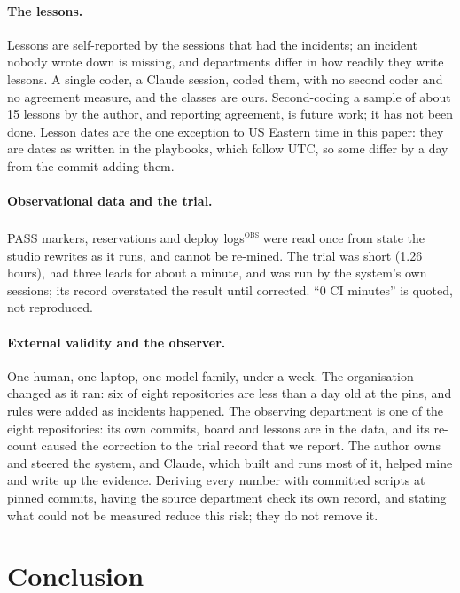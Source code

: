 \documentclass[11pt]{article}
\newcommand{\obs}{\textsuperscript{\textsc{obs}}}
\begin{document}
\paragraph{The lessons.}
Lessons are self-reported by the sessions that had the incidents; an incident nobody
wrote down is missing, and departments differ in how readily they write lessons. A single
coder, a Claude session, coded them, with no second coder and no agreement measure, and
the classes are ours. Second-coding a sample of about 15 lessons by the author, and
reporting agreement, is future work; it has not been done.
Lesson dates are the one exception to US Eastern time in this paper: they are dates as
written in the playbooks, which follow UTC, so some differ by a day from the commit adding
them.

\paragraph{Observational data and the trial.}
PASS markers, reservations and deploy logs\obs{} were read once from state the studio
rewrites as it runs, and cannot be re-mined. The trial was short (1.26 hours), had three %
leads for about a minute, and was run by the system's own sessions; its record overstated
the result until corrected. ``0 CI minutes'' is quoted, not reproduced.

\paragraph{External validity and the observer.}
One human, one laptop, one model family, under a week. The organisation changed as it
ran: six of eight repositories are less than a day old at the pins, and rules were added %
as incidents happened. The observing department is one of the eight repositories: its
own commits, board and lessons are in the data, and its re-count caused the correction to
the trial record that we report. The author owns and steered the system, and Claude, which built and
runs most of it, helped mine and write up the evidence. Deriving every number with
committed scripts at pinned commits, having the source department check its own record,
and stating what could not be measured reduce this risk; they do not remove it.

\section{Conclusion}\label{sec:conclusion}
\end{document}
